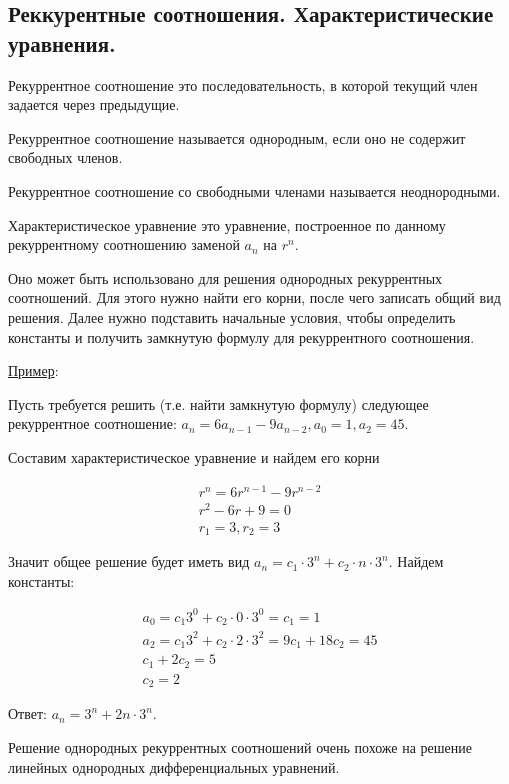 \subsection{%
  Реккурентные соотношения. Характеристические уравнения.%
}

\begin{definition}
  Рекуррентное соотношение это последовательность, в которой текущий член
  задается через предыдущие.
\end{definition}

\begin{definition}
  Рекуррентное соотношение называется однородным, если оно не содержит свободных
  членов.

  Рекуррентное соотношение со свободными членами называется неоднородными.
\end{definition}

\begin{definition}
  Характеристическое уравнение это уравнение, построенное по данному
  рекуррентному соотношению заменой \(a_{n}\) на \(r^{n}\).
\end{definition}

Оно может быть использовано для решения однородных рекуррентных соотношений. Для
этого нужно найти его корни, после чего записать общий вид решения. Далее нужно
подставить начальные условия, чтобы определить константы и получить замкнутую
формулу для рекуррентного соотношения.

\underline{Пример}:

Пусть требуется решить (т.е. найти замкнутую формулу) следующее рекуррентное
соотношение: \(a_{n} = 6 a_{n - 1} - 9 a_{n - 2}, a_{0} = 1, a_{2} = 45\).

Составим характеристическое уравнение и найдем его корни

\begin{align*}
  r^{n} = 6 r^{n - 1} - 9 r^{n - 2} \\
  r^{2} - 6 r + 9 = 0 \\
  r_{1} = 3, r_{2} = 3
\end{align*}

Значит общее решение будет иметь вид
\(a_{n} = c_{1} \cdot 3^{n} + c_{2} \cdot n \cdot 3^{n}\).
Найдем константы:

\begin{align*}
  a_{0} = c_{1} 3^{0} + c_{2} \cdot 0 \cdot 3^{0} = c_{1} = 1 \\
  a_{2} = c_{1} 3^{2} + c_{2} \cdot 2 \cdot 3^{2} = 9 c_{1} + 18 c_{2} = 45 \\
  c_{1} + 2 c_{2} = 5 \\
  c_{2} = 2
\end{align*}

Ответ: \(a_{n} = 3^{n} + 2n \cdot 3^{n}\).

\begin{remark}
  Решение однородных рекуррентных соотношений очень похоже на решение линейных
  однородных дифференциальных уравнений.
\end{remark}
